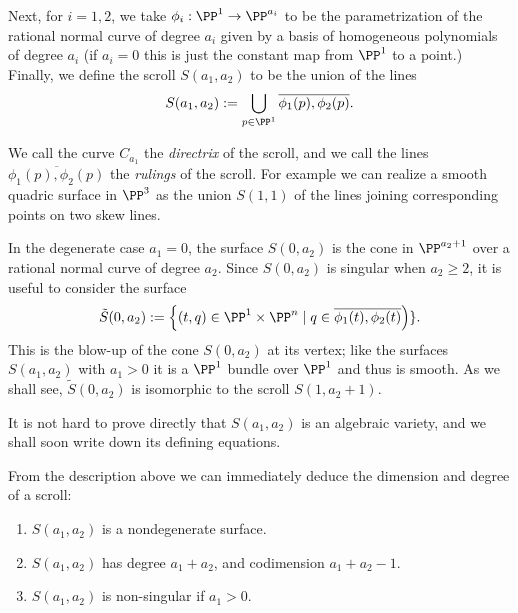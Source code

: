 Next, for $i=1,2$, we take $\phi_i : \PP^1 \to \PP^{a_i}$ to be the parametrization of the rational normal curve of degree $a_i$ given by a basis of homogeneous polynomials of degree $a_i$ (if $a_i = 0$ this is just the constant map from $\PP^1$ to a point.) Finally, we define the scroll $S(a_1, a_2)$ to be the union of the lines
$$
S(a_1,a_2) := \bigcup_{p\in \PP^1} \overline{\phi_1(p), \phi_2(p)}.
$$

We call the curve $C_{a_{1}}$ the \emph{directrix} of the scroll, and we call the lines $ \overline{\phi_1(p), \phi_2(p)}$ the \emph{rulings} of the scroll. For example we can realize a smooth quadric surface in $\PP^3$ as the union $S(1,1)$ of the lines joining corresponding points on two skew lines. 


In the degenerate case $a_{1}= 0$, the surface $S(0,a_{2})$ is the cone
in $\PP^{a_{2}+1}$ over a rational normal curve of degree $a_{2}$. Since $S(0,a_2)$ is singular when $a_2\geq 2$, it is useful to consider the surface
$$
\tilde S(0, a_2) := \left\{ (t, q) \in \PP^1 \times \PP^n  \mid q \in \overline{\phi_1(t), \phi_2(t)}\right)\}.
$$
This is the blow-up of the cone $S(0, a_2)$ at its vertex; like the surfaces $S(a_1,a_2)$ with $a_1 > 0$ it is a $\PP^1$ bundle over $\PP^1$ and thus is smooth. As we shall see, $\tilde S(0, a_2)$ is isomorphic to the scroll $S(1, a_2+1)$.

It is not hard to prove directly that $S(a_1,a_2)$ is an algebraic variety, and we shall soon write down its defining equations.

From the description above we can immediately deduce the dimension and degree of a scroll:

\begin{proposition}
\begin{enumerate}
\item $S(a_1,a_2)$ is a nondegenerate surface.
 \item $S(a_1,a_2)$ has degree $a_1+a_2$, and codimension $a_1+a_2-1.$
 \item $S(a_{1},a_{2})$ is non-singular if $a_{1}>0$.
 \end{enumerate}
\end{proposition}\label{deg and codim}


